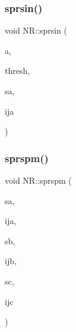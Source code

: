 \mbox{\label{namespaceNR_ac6049ef83ac59033cd16008d6434dbd9}} 
\subsubsection{\texorpdfstring{sprsin()}{sprsin()}}
{\footnotesize\ttfamily void N\+R\+::sprsin (\begin{DoxyParamCaption}\item[{\mbox{\hyperlink{namespaceNR_a2b8abfda8fffad6ba0a1b5a4c0773dbf}{Mat\+\_\+\+I\+\_\+\+DP}} \&}]{a,  }\item[{const \mbox{\hyperlink{namespaceNR_af6ff762dd605ff477b8e52387253a02a}{DP}}}]{thresh,  }\item[{\mbox{\hyperlink{namespaceNR_a970094d23441f8ef6a45282a7eb2103d}{Vec\+\_\+\+O\+\_\+\+DP}} \&}]{sa,  }\item[{\mbox{\hyperlink{namespaceNR_ade2338f6d53b7da3dd6d1c04804541f2}{Vec\+\_\+\+O\+\_\+\+I\+NT}} \&}]{ija }\end{DoxyParamCaption})}

\mbox{\label{namespaceNR_a5e13fa9b150938fe86e025d574065cba}} 
\subsubsection{\texorpdfstring{sprspm()}{sprspm()}}
{\footnotesize\ttfamily void N\+R\+::sprspm (\begin{DoxyParamCaption}\item[{\mbox{\hyperlink{namespaceNR_a9f943da53862537c552e2a770cb170ae}{Vec\+\_\+\+I\+\_\+\+DP}} \&}]{sa,  }\item[{\mbox{\hyperlink{namespaceNR_ae67ce7dc86a8a64a7ce73c3c030ff610}{Vec\+\_\+\+I\+\_\+\+I\+NT}} \&}]{ija,  }\item[{\mbox{\hyperlink{namespaceNR_a9f943da53862537c552e2a770cb170ae}{Vec\+\_\+\+I\+\_\+\+DP}} \&}]{sb,  }\item[{\mbox{\hyperlink{namespaceNR_ae67ce7dc86a8a64a7ce73c3c030ff610}{Vec\+\_\+\+I\+\_\+\+I\+NT}} \&}]{ijb,  }\item[{\mbox{\hyperlink{namespaceNR_a970094d23441f8ef6a45282a7eb2103d}{Vec\+\_\+\+O\+\_\+\+DP}} \&}]{sc,  }\item[{\mbox{\hyperlink{namespaceNR_ae67ce7dc86a8a64a7ce73c3c030ff610}{Vec\+\_\+\+I\+\_\+\+I\+NT}} \&}]{ijc }\end{DoxyParamCaption})}

